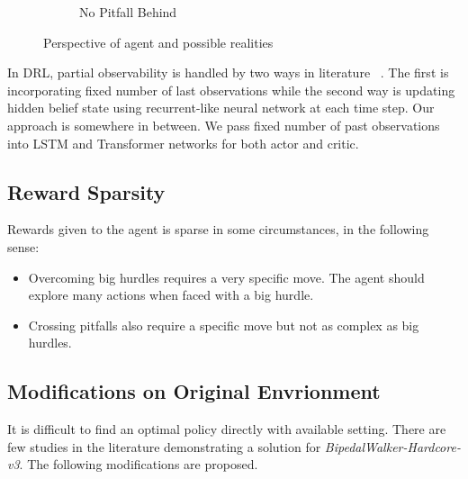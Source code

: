\begin{figure}
\begin{subfigure}{.32\textwidth}
		\caption{No Pitfall Behind}
		\label{fig:no_pitfall_behind}
	\end{subfigure}
	\caption{Perspective of agent and possible realities}
	\label{fig:partial_obs_pitfall}
\end{figure}

In DRL, partial observability is handled by two ways in literature~ \cite{dulac-arnold_challenges_2019}. 
The first is incorporating fixed number of last observations while the second way is updating hidden belief state using recurrent-like neural network at each time step. 
Our approach is somewhere in between. We pass fixed number of past observations into LSTM and Transformer networks for both actor and critic. 

\subsection{Reward Sparsity}

Rewards given to the agent is sparse in some circumstances, in the following sense:
\begin{itemize}
	\item Overcoming big hurdles requires a very specific move. 
	The agent should explore many actions when faced with a big hurdle.
	\item Crossing pitfalls also require a specific move but not as complex as big hurdles.
\end{itemize}

\subsection{Modifications on Original Envrionment}

It is difficult to find an optimal policy directly with available setting. 
There are few studies in the literature demonstrating a solution for \textit{BipedalWalker-Hardcore-v3}. 
The following modifications are proposed.

